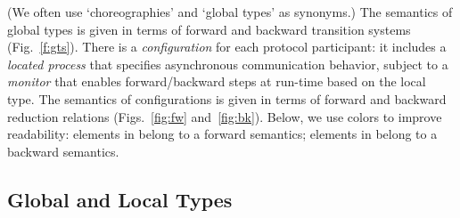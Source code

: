 \documentclass[runningheads]{llncs}
\begin{document}
(We often use `choreographies' and `global types' as synonyms.)
The semantics of global types is given in terms of forward and backward  transition systems (Fig.~\ref{f:gts}). 
There is a \emph{configuration} for each protocol participant: it includes a \emph{located process}
that 
 specifies asynchronous communication behavior, subject to a \emph{monitor}
that enables forward/backward steps at run-time
based on the local type.
The semantics of configurations is given in terms of forward and backward reduction relations (Figs.~\ref{fig:fw} and~\ref{fig:bk}).
Below, we  use colors to improve readability:
elements in  belong to a forward semantics;
elements in  belong to a backward semantics.

\subsection{Global and Local Types}
\end{document}
